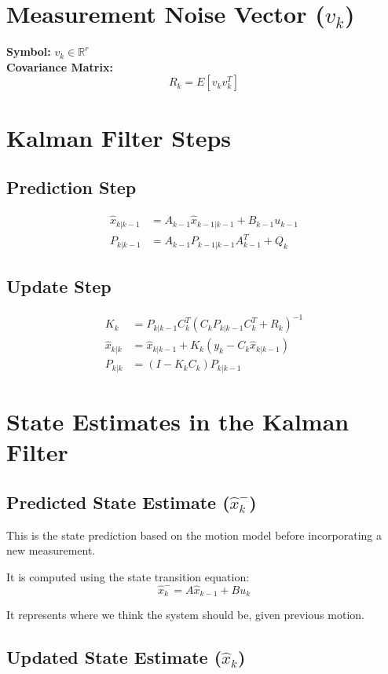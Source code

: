 \documentclass{article}
\begin{document}
\section{Measurement Noise Vector ($v_k$)}
\textbf{Symbol:} $v_k \in \mathbb{R}^{r}$  \\
\textbf{Covariance Matrix:}
\[
    R_k = E[v_k v_k^T]
\]

\section{Kalman Filter Steps}
\subsection{Prediction Step}
\begin{align*}
    \hat{x}_{k|k-1} &= A_{k-1} \hat{x}_{k-1|k-1} + B_{k-1} u_{k-1} \\
    P_{k|k-1} &= A_{k-1} P_{k-1|k-1} A_{k-1}^T + Q_k
\end{align*}

\subsection{Update Step}
\begin{align*}
    K_k &= P_{k|k-1} C_k^T (C_k P_{k|k-1} C_k^T + R_k)^{-1} \\
    \hat{x}_{k|k} &= \hat{x}_{k|k-1} + K_k (y_k - C_k \hat{x}_{k|k-1}) \\
    P_{k|k} &= (I - K_k C_k) P_{k|k-1}
\end{align*}

\section*{State Estimates in the Kalman Filter}

\subsection*{Predicted State Estimate (\(\hat{x}_{k}^{-}\))}

This is the state prediction based on the motion model before incorporating a new measurement.

It is computed using the state transition equation:
\[
\hat{x}_{k}^{-} = A \hat{x}_{k-1} + B u_k
\]

It represents where we think the system should be, given previous motion.

\subsection*{Updated State Estimate (\(\hat{x}_{k}\))}
\end{document}
